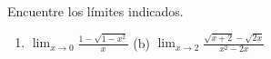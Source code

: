 \item Encuentre los límites indicados.
\begin{enumerate}
    \item[(a)] $\displaystyle \lim_{x \to 0} \frac{1 - \sqrt{1-x^2}}{x}$ \quad (b) $\displaystyle \lim_{x \to 2} \frac{\sqrt{x+2} - \sqrt{2x}}{x^2-2x}$
\end{enumerate}

